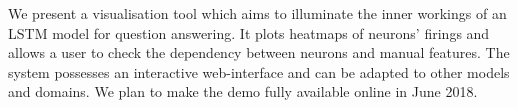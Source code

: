 We present a visualisation tool which aims to illuminate the inner workings of an LSTM model for question answering. It plots heatmaps of neurons' firings and allows a user to check the dependency between neurons and manual features. The system possesses an interactive web-interface and can be adapted to other models and domains. We plan to make the demo fully available online in June 2018.
